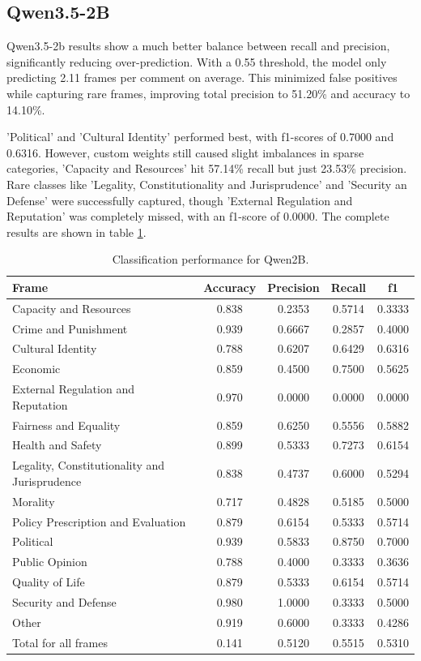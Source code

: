 \documentclass[
10pt, %
a4paper, %
oneside, %
headinclude,footinclude, %
] {book}%
\begin{document}
    
\subsection{Qwen3.5-2B}
Qwen3.5-2b results show a much better balance between recall and precision, significantly reducing over-prediction. With a 0.55 threshold, the model only predicting 2.11 frames per comment on average. This minimized false positives while capturing rare frames, improving total precision to 51.20\% and accuracy to 14.10\%.

'Political' and 'Cultural Identity' performed best, with f1-scores of 0.7000 and 0.6316. However, custom weights still caused slight imbalances in sparse categories, 'Capacity and Resources' hit 57.14\% recall but just 23.53\% precision. Rare classes like 'Legality, Constitutionality and Jurisprudence' and 'Security an Defense' were successfully captured, though 'External Regulation and Reputation' was completely missed, with an f1-score of 0.0000. The complete results are shown in table \ref{tab:qwen2b_classification}.


\begin{table}[htbp]
\small
\centering
\begin{tabular}{|l|c|c|c|c|}
\hline
\textbf{Frame} & \textbf{Accuracy} & \textbf{Precision} & \textbf{Recall} & \textbf{f1} \\
\hline
Capacity and Resources & 0.838 & 0.2353 & 0.5714 & 0.3333 \\\hline
Crime and Punishment & 0.939 & 0.6667 & 0.2857 & 0.4000 \\\hline
Cultural Identity & 0.788 & 0.6207 & 0.6429 & 0.6316 \\\hline
Economic & 0.859 & 0.4500 & 0.7500 & 0.5625 \\\hline
External Regulation and Reputation & 0.970 & 0.0000 & 0.0000 & 0.0000 \\\hline
Fairness and Equality & 0.859 & 0.6250 & 0.5556 & 0.5882 \\\hline
Health and Safety & 0.899 & 0.5333 & 0.7273 & 0.6154 \\\hline
Legality, Constitutionality and Jurisprudence & 0.838 & 0.4737 & 0.6000 & 0.5294 \\\hline
Morality & 0.717 & 0.4828 & 0.5185 & 0.5000 \\\hline
Policy Prescription and Evaluation & 0.879 & 0.6154 & 0.5333 & 0.5714 \\\hline
Political & 0.939 & 0.5833 & 0.8750 & 0.7000 \\\hline
Public Opinion & 0.788 & 0.4000 & 0.3333 & 0.3636 \\\hline
Quality of Life & 0.879 & 0.5333 & 0.6154 & 0.5714 \\\hline
Security and Defense & 0.980 & 1.0000 & 0.3333 & 0.5000 \\
\hline
Other & 0.919 & 0.6000 & 0.3333 & 0.4286 \\\hline
Total for all frames & 0.141 & 0.5120 & 0.5515 & 0.5310 \\
\hline
\end{tabular}
\caption{Classification performance for Qwen2B.}
\label{tab:qwen2b_classification}
\end{table}
    
\end{document}
